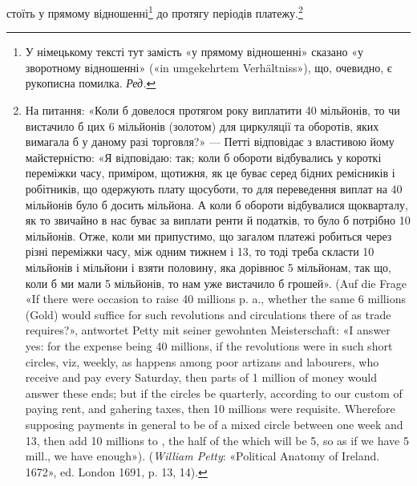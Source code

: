 стоїть у прямому відношенні\footnote*{
У німецькому тексті тут замість «у прямому відношенні» сказано
«у зворотному відношенні» («in umgekehrtem Verhältniss»), що, очевидно,
є рукописна помилка. \emph{Ред.}
} до протягу періодів платежу.\footnote{
На питання: «Коли б довелося протягом року виплатити 40 мільйонів,
то чи вистачило б цих 6 мільйонів (золотом) для циркуляції та оборотів,
яких вимагала б у даному разі торговля?» — Петті відповідає з
властивою йому майстерністю: «Я відповідаю: так; коли б обороти відбувались
у короткі переміжки часу, приміром, щотижня, як це буває
серед бідних ремісників і робітників, що одержують плату щосуботи, то
для переведення виплат на 40 мільйонів було б досить  мільйона.
А коли б обороти відбувалися щокварталу, як то звичайно в нас буває
за виплати ренти й податків, то було б потрібно 10 мільйонів. Отже, коли
ми припустимо, що загалом платежі робиться через різні переміжки часу,
між одним тижнем і 13, то тоді треба скласти 10 мільйонів і  мільйони
і взяти половину, яка дорівнює 5 мільйонам, так що, коли б ми мали
5 мільйонів, то нам уже вистачило б грошей». (Auf die Frage «If there were
occasion to raise 40 millions p. a., whether the same 6 millions (Gold) would
suffice for such revolutions and circulations there of as trade requires?», antwortet
Petty mit seiner gewohnten Meisterschaft: «I answer yes: for the expense
being 40 millions, if the revolutions were in such short circles, viz, weekly,
as happens among poor artizans and labourers, who receive and pay every
Saturday, then  parts of 1 million of money would answer these ends;
but if the circles be quarterly, according to our custom of paying rent, and
gahering taxes, then 10 millions were requisite. Wherefore supposing payments
in general to be of a mixed circle between one week and 13, then add
10 millions to , the half of the which will be 5, so as if we have
5 mill., we have enough»). (\emph{William Petty}: «Political Anatomy of Ireland.
1672», ed. London 1691, p. 13, 14).
}
